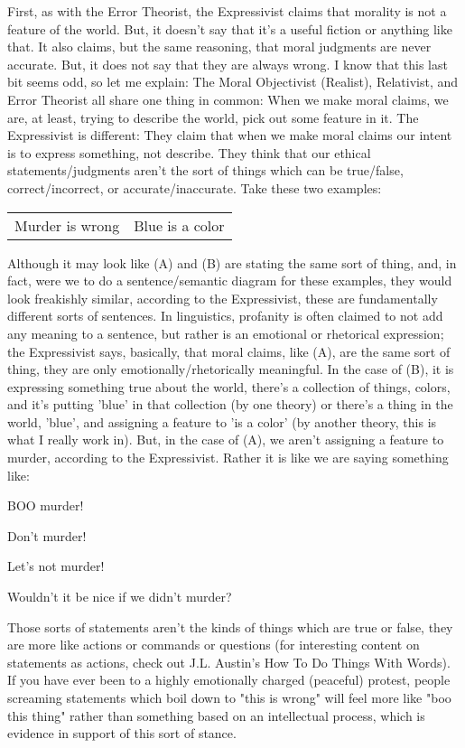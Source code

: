 First, as with the Error Theorist, the Expressivist claims that morality is not a feature of the world. But, it doesn't say that it's a useful fiction or anything like that. It also claims, but the same reasoning, that moral judgments are never accurate. But, it does not say that they are always wrong. I know that this last bit seems odd, so let me explain: The Moral Objectivist (Realist), Relativist, and Error Theorist all share one thing in common: When we make moral claims, we are, at least, trying to describe the world, pick out some feature in it. The Expressivist is different: They claim that when we make moral claims our intent is to express something, not describe. They think that our ethical statements/judgments aren't the sort of things which can be true/false, correct/incorrect, or accurate/inaccurate. Take these two examples: 
\begin{tabular}{p{1in}|p{1in}}
    Murder is wrong&Blue is a color
\end{tabular}
Although it may look like (A) and (B) are stating the same sort of thing, and, in fact, were we to  do a sentence/semantic diagram for these examples, they would look freakishly similar, according to the Expressivist, these are fundamentally different sorts of sentences. In linguistics, profanity is often claimed to not add any meaning to a sentence, but rather is an emotional or rhetorical expression; the Expressivist says, basically, that moral claims, like (A), are the same sort of thing, they are only emotionally/rhetorically meaningful. In the case of (B), it is expressing something true about the world, there's a collection of things, colors, and it's putting 'blue' in that collection (by one theory) or there's a thing in the world, 'blue', and assigning a feature to 'is a color' (by another theory, this is what I really work in). But, in the case of (A), we aren’t assigning a feature to murder, according to the Expressivist. Rather it is like we are saying something like:
\begin{earg}
    \item[]BOO murder!
    \item[]Don’t murder!
    \item[]Let’s not murder!
    \item[]Wouldn’t it be nice if we didn’t murder?
\end{earg}
Those sorts of statements aren’t the kinds of things which are true or false, they are more like actions or commands or questions (for interesting content on statements as actions, check out J.L. Austin's How To Do Things With Words). If you have ever been to a highly emotionally charged (peaceful) protest, people screaming statements which boil down to "this is wrong" will feel more like "boo this thing" rather than something based on an intellectual process, which is evidence in support of this sort of stance. 

